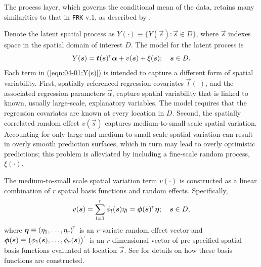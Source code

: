 \documentclass[12pt,a4paper]{article}
\begin{document}
The process layer, which governs the conditional mean of the data, retains many similarities to that in \texttt{FRK} v.1, as described by \cite{FRK_paper}.


Denote the latent spatial process as $Y(\cdot) \equiv \{Y(\vec{s}) \colon \vec{s}\in D\}$, where $\vec{s}$ indexes space in the spatial domain of interest $D$. 
The model for the latent process is
\begin{equation}\label{eqn:04-01:Y(s)}
    Y(\vec{s}) = \vec{t}(\vec{s})^\tp \vec{\alpha} + v(\vec{s}) + \xi(\vec{s}); \quad \vec{s} \in D.
\end{equation}
Each term in (\ref{eqn:04-01:Y(s)}) is intended to capture a different form of spatial variability. 
First, spatially referenced regression covariates $\vec{t}(\cdot)$, and the associated regression parameters $\vec{\alpha}$, capture spatial variability that is linked to known, usually large-scale, explanatory variables. 
The model requires that the regression covariates are known at every location in $D$. 
Second, the spatially correlated random effect $v(\vec{s})$ captures medium-to-small scale spatial variation.
Accounting for only large and medium-to-small scale spatial variation can result in overly smooth prediction surfaces, which in turn may lead to overly optimistic predictions; this problem is alleviated by including a fine-scale random process, $\xi(\cdot)$. 

The medium-to-small scale spatial variation term $v(\cdot)$ is constructed as a linear combination of $r$ spatial basis functions and random effects. Specifically,
\[
v(\vec{s}) 
= \sum_{l=1}^r \phi_l(\vec{s})\eta_l
= \vec{\phi}(\vec{s})^\tp \vec{\eta}; \quad \vec{s} \in D,
\]
where $\vec{\eta} \equiv \left(\eta_1, \dots, \eta_r \right)^\tp$ is an $r$-variate random effect vector and $\vec{\phi}(\vec{s}) \equiv \left(\phi_1(\vec{s}), \dots, \phi_r(\vec{s}) \right)^\tp$ is an $r$-dimensional vector of pre-specified spatial basis functions evaluated at location $\vec{s}$. 
See \cite{FRK_paper} for details on how these basis functions are constructed.
\end{document}
